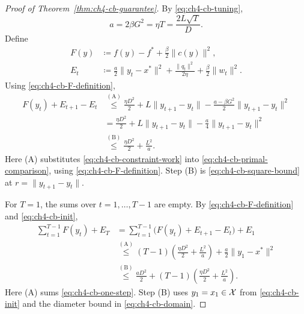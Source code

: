 \begin{proof}[Proof of Theorem~\ref{thm:ch4-cb-guarantee}]
By \eqref{eq:ch4-cb-tuning},
\begin{equation}\label{eq:ch4-cb-proof-notation}
a=2\beta G^2=\eta T=\frac{2L\sqrt T}{D}.
\end{equation}
Define
\begin{equation}\label{eq:ch4-cb-F-definition}
\begin{aligned}
F(y)&\coloneqq f(y)-f^*+\frac\beta2\|c(y)\|^2,\\
E_t&\coloneqq\frac a2\|y_t-x^*\|^2+\frac{\|q_t\|^2}{2\eta}+\frac\beta2\|w_t\|^2.
\end{aligned}
\end{equation}
Using \eqref{eq:ch4-cb-F-definition},
\begin{equation}\label{eq:ch4-cb-one-step}
\begin{aligned}
F(y_t)+E_{t+1}-E_t
&\overset{\mathrm{(A)}}{\le}
\frac{\eta D^2}{2}+L\|y_{t+1}-y_t\|-\frac{a-\beta G^2}{2}\|y_{t+1}-y_t\|^2\\
&=\frac{\eta D^2}{2}+L\|y_{t+1}-y_t\|-\frac a4\|y_{t+1}-y_t\|^2
\\&\overset{\mathrm{(B)}}{\le}\frac{\eta D^2}{2}+\frac{L^2}{a}.
\end{aligned}
\end{equation}
\nopagebreak[3]
Here (A) substitutes \eqref{eq:ch4-cb-constraint-work} into
\eqref{eq:ch4-cb-primal-comparison}, using
\eqref{eq:ch4-cb-F-definition}.
Step (B) is \eqref{eq:ch4-cb-square-bound} at $r=\|y_{t+1}-y_t\|$.

For $T=1$, the sums over $t=1,\ldots,T-1$ are empty.
By \eqref{eq:ch4-cb-F-definition} and \eqref{eq:ch4-cb-init},
\begin{equation}\label{eq:ch4-cb-summed-comparison}
\begin{aligned}
\sum_{t=1}^{T-1}F(y_t)+E_T
&=\sum_{t=1}^{T-1}\bigl(F(y_t)+E_{t+1}-E_t\bigr)+E_1\\
&\overset{\mathrm{(A)}}{\le}
(T-1)\left(\frac{\eta D^2}{2}+\frac{L^2}{a}\right)
+\frac a2\|y_1-x^*\|^2\\
&\overset{\mathrm{(B)}}{\le}
\frac{aD^2}{2}+(T-1)\left(\frac{\eta D^2}{2}+\frac{L^2}{a}\right).
\end{aligned}
\end{equation}
\nopagebreak[3]
Here (A) sums \eqref{eq:ch4-cb-one-step}. Step (B) uses
$y_1=x_1\in\mathcal{X}$ from \eqref{eq:ch4-cb-init} and
the diameter bound in \eqref{eq:ch4-cb-domain}.


\end{proof}
